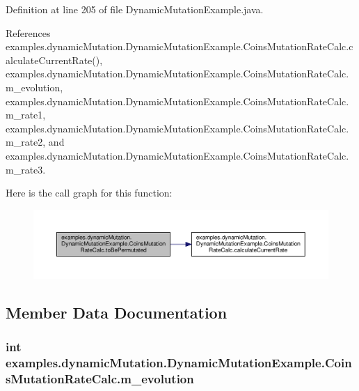 Definition at line 205 of file Dynamic\-Mutation\-Example.\-java.



References examples.\-dynamic\-Mutation.\-Dynamic\-Mutation\-Example.\-Coins\-Mutation\-Rate\-Calc.\-calculate\-Current\-Rate(), examples.\-dynamic\-Mutation.\-Dynamic\-Mutation\-Example.\-Coins\-Mutation\-Rate\-Calc.\-m\-\_\-evolution, examples.\-dynamic\-Mutation.\-Dynamic\-Mutation\-Example.\-Coins\-Mutation\-Rate\-Calc.\-m\-\_\-rate1, examples.\-dynamic\-Mutation.\-Dynamic\-Mutation\-Example.\-Coins\-Mutation\-Rate\-Calc.\-m\-\_\-rate2, and examples.\-dynamic\-Mutation.\-Dynamic\-Mutation\-Example.\-Coins\-Mutation\-Rate\-Calc.\-m\-\_\-rate3.



Here is the call graph for this function\-:
\nopagebreak
\begin{figure}[H]
\begin{center}
\leavevmode
\includegraphics[width=350pt]{classexamples_1_1dynamic_mutation_1_1_dynamic_mutation_example_1_1_coins_mutation_rate_calc_acd41ed17033a68b250901ef41d546056_cgraph}
\end{center}
\end{figure}




\subsection{Member Data Documentation}
\hypertarget{classexamples_1_1dynamic_mutation_1_1_dynamic_mutation_example_1_1_coins_mutation_rate_calc_a3da954e31d2649518e4da534062a550f}{
\subsubsection[{m\-\_\-evolution}]{\setlength{\rightskip}{0pt plus 5cm}int examples.\-dynamic\-Mutation.\-Dynamic\-Mutation\-Example.\-Coins\-Mutation\-Rate\-Calc.\-m\-\_\-evolution\hspace{0.3cm}{\ttfamily [private]}}}\label{classexamples_1_1dynamic_mutation_1_1_dynamic_mutation_example_1_1_coins_mutation_rate_calc_a3da954e31d2649518e4da534062a550f}



